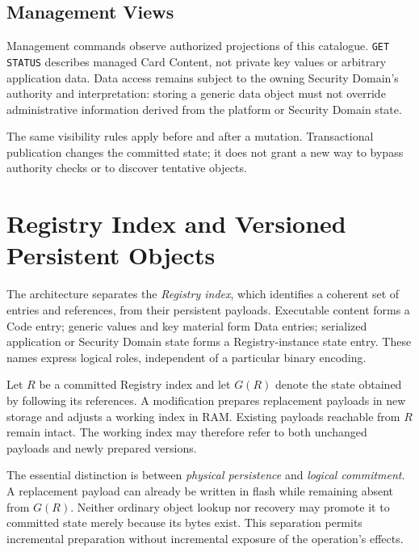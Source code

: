 \subsection{Management Views}
\label{subsec:registry-get-store-data-fallback}

Management commands observe authorized projections of this catalogue.
\texttt{GET STATUS} describes managed Card Content, not private key values or
arbitrary application data. Data access remains subject to the owning
Security Domain's authority and interpretation: storing a generic data object
must not override administrative information derived from the platform or
Security Domain state.

The same visibility rules apply before and after a mutation. Transactional
publication changes the committed state; it does not grant a new way to bypass
authority checks or to discover tentative objects.

\section{Registry Index and Versioned Persistent Objects}
\label{sec:persistence-memory-model}
\label{sec:append-only-transactional-registry}
\label{subsec:persistence-block-families}

The architecture separates the \emph{Registry index}, which identifies a
coherent set of entries and references, from their persistent payloads.
Executable content forms a Code entry; generic values and key material form
Data entries; serialized application or Security Domain state forms a
Registry-instance state entry. These names express logical roles, independent
of a particular binary encoding.

Let $R$ be a committed Registry index and let $G(R)$ denote the state obtained
by following its references. A modification prepares replacement payloads in
new storage and adjusts a working index in RAM. Existing payloads reachable
from $R$ remain intact. The working index may therefore refer to both
unchanged payloads and newly prepared versions.

The essential distinction is between \emph{physical persistence} and
\emph{logical commitment}. A replacement payload can already be written in
flash while remaining absent from $G(R)$. Neither ordinary object lookup nor
recovery may promote it to committed state merely because its bytes exist.
This separation permits incremental preparation without incremental exposure
of the operation's effects.

